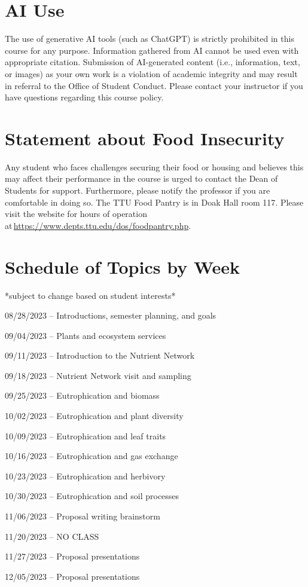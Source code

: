 \documentclass[12pt, notitlepage]{article}   	%
\begin{document}
{\section{AI Use}
The use of generative AI tools (such as ChatGPT) is strictly prohibited in this course for any purpose.
Information gathered from AI cannot be used even with appropriate citation. Submission of AI-generated
content (i.e., information, text, or images) as your own work is a violation of academic integrity and may
result in referral to the Office of Student Conduct. Please contact your instructor if you have questions
regarding this course policy.

\section{Statement about Food Insecurity}
Any student who faces challenges securing their food or housing
and believes this may affect their performance in the course is
urged to contact the Dean of Students for support. Furthermore,
please notify the professor if you are comfortable in doing so. The
TTU Food Pantry is in Doak Hall room 117. Please visit the
website for hours of operation at \url{https://www.depts.ttu.edu/dos/foodpantry.php}.


\newpage

\section*{Schedule of Topics by Week}
*subject to change based on student interests* \par
08/28/2023 – Introductions, semester planning, and goals \par
09/04/2023 – Plants and ecosystem services \par
09/11/2023 – Introduction to the Nutrient Network \par
09/18/2023 – Nutrient Network visit and sampling \par
09/25/2023 – Eutrophication and biomass \par
10/02/2023 – Eutrophication and plant diversity \par
10/09/2023 – Eutrophication and leaf traits \par
10/16/2023 – Eutrophication and gas exchange \par
10/23/2023 – Eutrophication and herbivory \par
10/30/2023 – Eutrophication and soil processes \par
11/06/2023 – Proposal writing brainstorm \par
11/20/2023 – NO CLASS \par
11/27/2023 – Proposal presentations \par
12/05/2023 – Proposal presentations \par

} %
\end{document}

